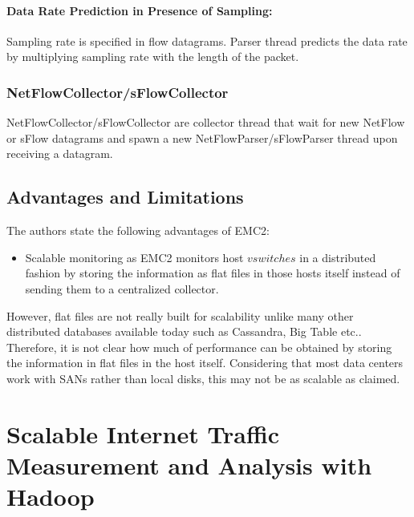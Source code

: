     \paragraph{Data Rate Prediction in Presence of Sampling:}
       Sampling rate is specified in flow datagrams. Parser thread predicts the data rate by multiplying  sampling rate with the length 
       of the packet.
   
    \subsubsection{NetFlowCollector/sFlowCollector}
      NetFlowCollector/sFlowCollector are collector thread that wait %
      for new NetFlow or sFlow datagrams and spawn a new NetFlowParser/sFlowParser thread upon receiving a datagram.
      
    \subsection{Advantages and Limitations}
    The authors state the following advantages of EMC2:

    \begin{itemize}
     \item Scalable monitoring as EMC2 monitors host $vswitches$ in a distributed fashion by storing the information as flat files in
     those hosts itself instead of sending them to a centralized collector.
    \end{itemize}
    
    However, flat files are not really built for scalability unlike many other distributed databases available today such as Cassandra, 
    Big Table etc.. Therefore, it is not clear how much of performance can be obtained by storing the information in flat files in the host 
    itself. Considering that most data centers work with SANs rather than local disks, this may not be as scalable as claimed.
    

   \section{Scalable Internet Traffic Measurement and Analysis with Hadoop \cite{Lee}}
